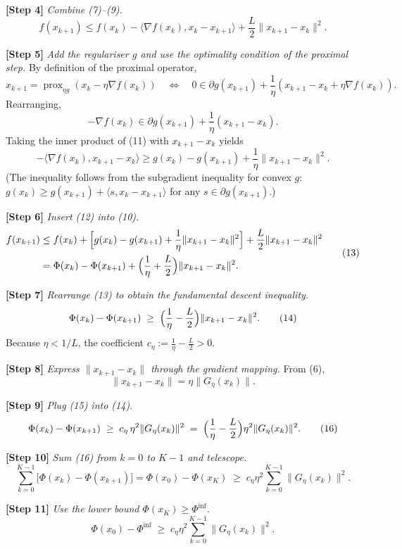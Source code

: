 \documentclass{article}
\newcommand{\prox}{\operatorname{prox}}
\newcommand{\grad}{\nabla}
\begin{document}
\noindent\textbf{[Step 4]} \emph{Combine (7)–(9).}
\[
f(x_{k+1})\le f(x_{k})-\langle\grad f(x_{k}),x_{k}-x_{k+1}\rangle
+\frac{L}{2}\|x_{k+1}-x_{k}\|^{2}.
\tag{10}
\]

\noindent\textbf{[Step 5]} \emph{Add the regulariser $g$ and use the optimality condition of the proximal step.}  
By definition of the proximal operator,
\[
x_{k+1}= \prox_{\eta g}(x_{k}-\eta\grad f(x_{k}))
\quad\Longleftrightarrow\quad
0\in \partial g(x_{k+1})+\frac{1}{\eta}(x_{k+1}-x_{k}+\eta\grad f(x_{k})).
\]
Rearranging,
\[
-\grad f(x_{k})\in \partial g(x_{k+1})+\frac{1}{\eta}(x_{k+1}-x_{k}).
\tag{11}
\]
Taking the inner product of (11) with $x_{k+1}-x_{k}$ yields
\[
-\langle\grad f(x_{k}),x_{k+1}-x_{k}\rangle
\ge g(x_{k})-g(x_{k+1})+\frac{1}{\eta}\|x_{k+1}-x_{k}\|^{2}.
\tag{12}
\]
(The inequality follows from the subgradient inequality for convex $g$:
$g(x_{k})\ge g(x_{k+1})+\langle s, x_{k}-x_{k+1}\rangle$ for any $s\in\partial g(x_{k+1})$.)

\noindent\textbf{[Step 6]} \emph{Insert (12) into (10).}
\[
\begin{aligned}
f(x_{k+1}) &\le f(x_{k})+\Bigl[g(x_{k})-g(x_{k+1})+\frac{1}{\eta}\|x_{k+1}-x_{k}\|^{2}\Bigr]
+\frac{L}{2}\|x_{k+1}-x_{k}\|^{2} \\
&= \Phi(x_{k})-\Phi(x_{k+1})+\Bigl(\frac{1}{\eta}+\frac{L}{2}\Bigr)\|x_{k+1}-x_{k}\|^{2}.
\end{aligned}
\tag{13}
\]

\noindent\textbf{[Step 7]} \emph{Rearrange (13) to obtain the fundamental descent inequality.}
\[
\Phi(x_{k})-\Phi(x_{k+1})
\;\ge\;\Bigl(\frac{1}{\eta}-\frac{L}{2}\Bigr)\|x_{k+1}-x_{k}\|^{2}.
\tag{14}
\]
Because $\eta<1/L$, the coefficient $c_{\eta}:=\frac{1}{\eta}-\frac{L}{2}>0$.

\noindent\textbf{[Step 8]} \emph{Express $\|x_{k+1}-x_{k}\|$ through the gradient mapping.}  
From (6),
\[
\|x_{k+1}-x_{k}\|=\eta\|G_{\eta}(x_{k})\|.
\tag{15}
\]

\noindent\textbf{[Step 9]} \emph{Plug (15) into (14).}
\[
\Phi(x_{k})-\Phi(x_{k+1})
\;\ge\;c_{\eta}\,\eta^{2}\|G_{\eta}(x_{k})\|^{2}
\;=\;\Bigl(\frac{1}{\eta}-\frac{L}{2}\Bigr)\eta^{2}\|G_{\eta}(x_{k})\|^{2}.
\tag{16}
\]

\noindent\textbf{[Step 10]} \emph{Sum (16) from $k=0$ to $K-1$ and telescope.}
\[
\sum_{k=0}^{K-1}\bigl[\Phi(x_{k})-\Phi(x_{k+1})\bigr]
= \Phi(x_{0})-\Phi(x_{K})
\;\ge\;c_{\eta}\eta^{2}\sum_{k=0}^{K-1}\|G_{\eta}(x_{k})\|^{2}.
\tag{17}
\]

\noindent\textbf{[Step 11]} \emph{Use the lower bound $\Phi(x_{K})\ge\Phi^{\inf}$.}
\[
\Phi(x_{0})-\Phi^{\inf}\;\ge\;c_{\eta}\eta^{2}\sum_{k=0}^{K-1}\|G_{\eta}(x_{k})\|^{2}.
\tag{18}
\]
\end{document}
